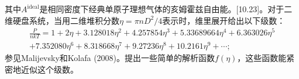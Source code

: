 其中\(A^{\mathrm{ideal}}\)是相同密度下经典单原子理想气体的亥姆霍兹自由能。{[}10.23{]}。对于二维硬盘系统，当用二维堆积分数\(\eta=\pi nD^{2}/4\)表示时，维里展开给出以下级数：
\begin{equation}\tag{10.7.54}\label{eq:10.7.54}
\begin{array}{r} { \frac { P } { n k T } = 1 + 2 \eta + 3 . 12 80 18 \eta ^{2} + 4 . 25 78 54 \eta ^{3} + 5 . 33 68 96 64 \eta ^{4} + 6 . 36 30 26 \eta ^{5} } \\{ + 7 . 35 20 80 \eta ^{6} + 8 . 31 86 68 \eta ^{7} + 9 . 27 23 6 \eta ^{8} + 10 . 21 61 \eta ^{9} + \cdots ; } \end{array}
\end{equation}
参见Malijevsky和Kolafa (2008)。提出一些简单的解析函数\(f(\eta)\)，这些函数能紧密地近似这个级数。



